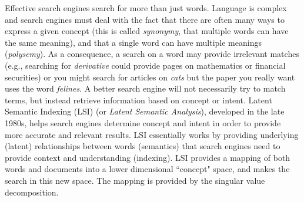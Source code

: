  \label{chap:SVD}

\vspace*{-17 pt}

\vspace*{13 pt}

\label{sec:appl_search_engn} 

Effective search engines search for more than just words. Language is complex and search engines must deal with the fact that there are often many ways to express a given concept (this is called \emph{synonymy}, that multiple words can have the same meaning), and that a single word can have multiple meanings (\emph{polysemy}). As a consequence, a search on a word may provide irrelevant matches (e.g., searching for \emph{derivative} could provide pages on mathematics or financial securities) or you might search for articles on \emph{cats} but the paper you really want uses the word \emph{felines}.  A better search engine will not necessarily try to match terms, but instead retrieve information based on concept or intent. Latent Semantic Indexing (LSI) (or \emph{Latent Semantic Analysis}), developed in the late 1980s, helps search engines determine concept and intent in order to provide more accurate and relevant results. LSI essentially works by providing underlying (latent) relationships between words (semantics) that search engines need to provide context and understanding (indexing). LSI provides a mapping of both words and documents into a lower dimensional  ``concept" space, and makes the search in this new space. The mapping is provided by the  singular value decomposition. 

\label{sec:svd_intro}

